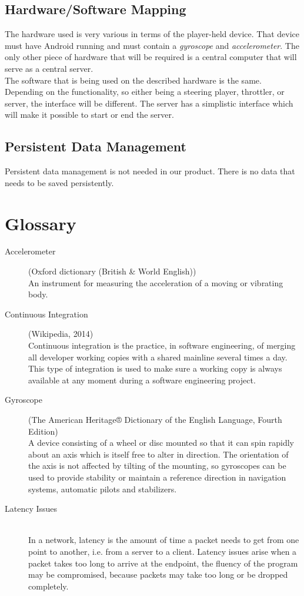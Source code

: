 \documentclass[11pt,twoside,a4paper]{article}
\begin{document}
\subsection{Hardware/Software Mapping}
The hardware used is very various in terms of the player-held device. That device must have Android running and must contain a \emph{gyroscope} and \emph{accelerometer}. The only other piece of hardware that will be required is a central computer that will serve as a central server. \\
The software that is being used on the described hardware is the same. Depending on the functionality, so either being a steering player, throttler, or server, the interface will be different. The server has a simplistic interface which will make it possible to start or end the server.


\subsection{Persistent Data Management}
Persistent data management is not needed in our product. There is no data that needs to be saved persistently.

\newpage


\section{Glossary}
\begin{description}
\item[Accelerometer] (Oxford dictionary (British \& World English)) \hfill \\
An instrument for measuring the acceleration of a moving or vibrating body.
\item[Continuous Integration] (Wikipedia, 2014) \hfill \\
Continuous integration is the practice, in software engineering, of merging all developer working copies with a shared mainline several times a day. This type of integration is used to make sure a working copy is always available at any moment during a software engineering project.
\item[Gyroscope] (The American Heritage® Dictionary of the English Language, Fourth Edition)\hfill \\
A device consisting of a wheel or disc mounted so that it can spin rapidly about an axis which is itself free to alter in direction. The orientation of the axis is not affected by tilting of the mounting, so gyroscopes can be used to provide stability or maintain a reference direction in navigation systems, automatic pilots and stabilizers.
\item[Latency Issues] \hfill \\
In a network, latency is the amount of time a packet needs to get from one point to another, i.e. from a server to a client. Latency issues arise when a packet takes too long to arrive at the endpoint, the fluency of the program may be compromised, because packets may take too long or be dropped completely. 
\end{description}
\end{document}
